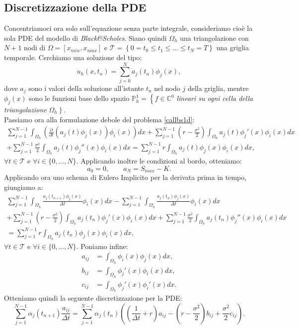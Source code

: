 \documentclass[a4paper,10pt]{report}
\theoremstyle{osservazione}
\theoremstyle{esempio}
\theoremstyle{notazione}
\theoremstyle{corollario}
\begin{document}
\subsection{Discretizzazione della PDE}
Concentriamoci ora solo sull'equazione senza parte integrale, consideriamo cio\`e la sola PDE del modello di \emph{Black\&Scholes}. Siano quindi $\Omega_h$ una triangolazione con $N+1$ nodi di $\Omega=[x_{min},x_{max}]$ e $\mathcal{T}=\left\{0= t_0\leq t_1\leq ... \leq t_N=T\right\}$ una griglia temporale. Cerchiamo una soluzione del tipo: $$u_h(x,t_n)=\sum_{j=0}^{N}a_j(t_n)\phi_j(x),$$ dove $a_j$ sono i valori della soluzione all'istante $t_n$ nel nodo $j$ della griglia, mentre $\phi_j(x)$ sono le funzioni base dello spazio $\mathbb{P}_h^1=\left\{f\in\mathbb{C}^0\right.$ \emph{lineari su ogni cella della triangolazione} $\Omega_h\left.\right\}$.\\Passiamo ora alla formulazione debole del problema \ref{callbs1d}:
\begin{multline}
\sum_{j=1}^{N-1}\int_{\Omega_h}\left(\frac{\partial}{\partial t}(a_j(t)\phi_j(x))\phi_i(x)\right)dx+\sum_{j=1}^{N-1}\left(r-\frac{\sigma^2}{2}\right)\int_{\Omega_h}a_j(t)\phi_j'(x)\phi_i(x)dx\\
+\sum_{j=1}^{N-1}\frac{\sigma^2}{2}\int_{\Omega_h}a_j(t)\phi_j''(x)\phi_i(x)dx=\sum_{j=1}^{N-1}r\int_{\Omega_h}a_j(t)\phi_j(x)\phi_i(x)dx,
\end{multline}
$\forall t\in\mathcal{T}$ e $\forall i\in\{0,...,N\}$. Applicando inoltre le condizioni al bordo, otteniamo: $$a_0=0, \qquad a_N=S_{max}-K.$$
Applicando ora uno schema di Eulero Implicito per la derivata prima in tempo, giungiamo a:
\begin{multline}
\sum_{j=1}^{N-1}\int_{\Omega_h}\frac{a_j(t_{n+1})\phi_j(x)}{\Delta t}\phi_i(x)dx-\sum_{j=1}^{N-1}\int_{\Omega_h}\frac{a_j(t_n)\phi_j(x)}{\Delta t}\phi_i(x)dx\\
+\sum_{j=1}^{N-1}\left(r-\frac{\sigma^2}{2}\right)\int_{\Omega_h}a_j(t_n)\phi_j'(x)\phi_i(x)dx+\sum_{j=1}^{N-1}\frac{\sigma^2}{2}\int_{\Omega_h}a_j(t_n)\phi_j''(x)\phi_i(x)dx\\
=\sum_{j=1}^{N-1}r\int_{\Omega_h}a_j(t_n)\phi_j(x)\phi_i(x)dx,
\end{multline}
$\forall t\in\mathcal{T}$ e $\forall i\in\{0,...,N\}$. Poniamo infine:
\begin{align*}
a_{ij}&=\int_{\Omega_h}\phi_i(x)\phi_j(x)dx,\\
b_{ij}&=\int_{\Omega_h}\phi_j'(x)\phi_i(x)dx,\\
c_{ij}&=\int_{\Omega_h}\phi_j'(x)\phi_i'(x)dx.
\end{align*}
Otteniamo quindi la seguente discretizzazione per la PDE:$$\sum_{j=1}^{N-1}\alpha_j(t_{n+1})\frac{a_{ij}}{\Delta t}=\sum_{j=1}^{N-1}\alpha_j(t_{n})\left(\left(\frac{1}{\Delta t}+r\right)a_{ij}-\left(r-\frac{\sigma^2}{2}\right)b_{ij}+\frac{\sigma^2}{2}c_{ij}\right).$$
\end{document}
